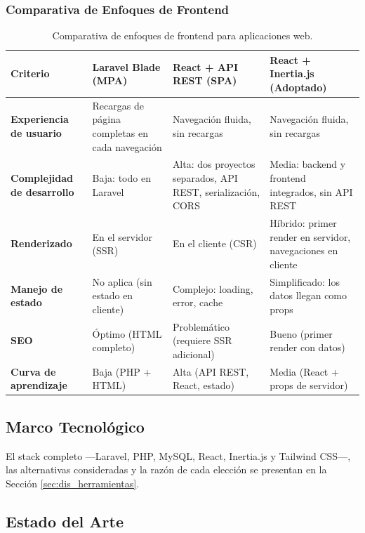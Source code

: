 \subsubsection{Comparativa de Enfoques de Frontend}

\begin{table}[!htbp]
\centering
\caption{Comparativa de enfoques de frontend para aplicaciones web.}
\label{tab:comparativa_frontend}
\begin{tabular}{|p{2.5cm}|p{3.5cm}|p{3.5cm}|p{3.5cm}|}
\hline
\textbf{Criterio} & \textbf{Laravel Blade (MPA)} & \textbf{React + API REST (SPA)} & \textbf{React + Inertia.js (Adoptado)} \\
\hline
\textbf{Experiencia de usuario} & Recargas de página completas en cada navegación & Navegación fluida, sin recargas & Navegación fluida, sin recargas \\
\hline
\textbf{Complejidad de desarrollo} & Baja: todo en Laravel & Alta: dos proyectos separados, API REST, serialización, CORS & Media: backend y frontend integrados, sin API REST \\
\hline
\textbf{Renderizado} & En el servidor (SSR) & En el cliente (CSR) & Híbrido: primer render en servidor, navegaciones en cliente \\
\hline
\textbf{Manejo de estado} & No aplica (sin estado en cliente) & Complejo: loading, error, cache & Simplificado: los datos llegan como props \\
\hline
\textbf{SEO} & Óptimo (HTML completo) & Problemático (requiere SSR adicional) & Bueno (primer render con datos) \\
\hline
\textbf{Curva de aprendizaje} & Baja (PHP + HTML) & Alta (API REST, React, estado) & Media (React + props de servidor) \\
\hline
\end{tabular}
\end{table}

\subsection{Marco Tecnológico}

El stack completo ---Laravel, PHP, MySQL, React, Inertia.js y Tailwind CSS---, las alternativas consideradas y la razón de cada elección se presentan en la Sección \ref{sec:dis_herramientas}.

\subsection{Estado del Arte}


